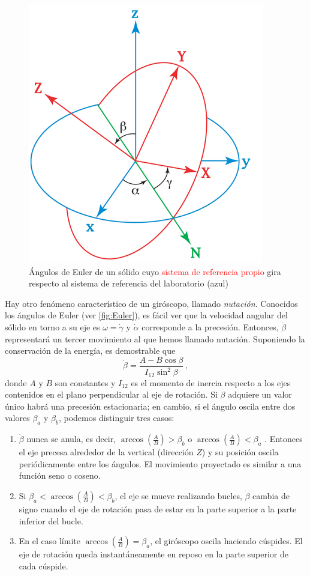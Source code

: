 \documentclass[a4paper]{article}
\begin{document}
\begin{figure}[h]
\begin{center}
\includegraphics[width=8 cm]{euler.png}
\caption{Ángulos de Euler de un sólido cuyo \textcolor{red}{sistema de referencia propio} gira respecto al \textcolor{blue!70!cyan!85!white}{sistema de referencia del laboratorio} (azul)}
\label{fig:Euler}
\end{center}
\end{figure}

Hay otro fenómeno característico de un giróscopo, llamado \textit{nutación}. Conocidos los ángulos de Euler (ver \autoref{fig:Euler}), es fácil ver que la velocidad angular del sólido en torno a su eje es $\omega=\dot{\gamma}$ y $\dot{\alpha}$ corresponde a la precesión. Entonces, $\dot{\beta}$ representará un tercer movimiento al que hemos llamado nutación. Suponiendo la conservación de la energía, es demostrable que 
\begin{equation}
\label{eq:nutacion}
\dot{\beta}=\frac{A-B\cos\beta}{I_{12}\sin^2\beta}\, ,
\end{equation}
donde $A$ y $B$ son constantes y $I_{12}$ es el momento de inercia respecto a los ejes contenidos en el plano perpendicular al eje de rotación. Si $\beta$ adquiere un valor único habrá una precesión estacionaria; en cambio, si el ángulo oscila entre dos valores $\beta_a$ y $\beta_b$, podemos distinguir tres casos:
\begin{enumerate}
\item $\dot{\beta}$ nunca se anula, es decir, $\arccos\left(\frac{A}{B}\right)>\beta_b$ o $\arccos\left(\frac{A}{B}\right)<\beta_a$ . Entonces el eje precesa alrededor de la vertical (dirección $Z$) y su posición oscila periódicamente entre los ángulos. El movimiento proyectado es similar a una función seno o coseno.
\item Si $\beta_a<\arccos\left(\frac{A}{B}\right)<\beta_b$, el eje se mueve realizando bucles, $\dot{\beta}$ cambia de signo cuando el eje de rotación pasa de estar en la parte superior a la parte inferior del bucle.
\item En el caso límite $\arccos\left(\frac{A}{B}\right)=\beta_a$, el giróscopo oscila haciendo cúspides. El eje de rotación queda instantáneamente en reposo en la parte superior de cada cúspide.
\end{enumerate}
\end{document}
